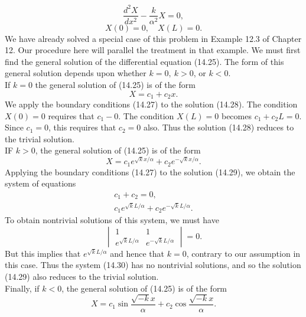 \documentclass[11pt,a4paper, twoside]{report}
\begin{document}
	\begin{equation}\tag{14.25}
		\frac{d^2X}{dx^2} - \frac{k}{\alpha^2}X = 0,
	\end{equation}
	\begin{equation}\tag{14.27}
		X(0) = 0,\quad X(L) = 0.
	\end{equation}
	We have already solved a special case of this problem in Example 12.3 of Chapter 12. Our procedure here will parallel the treatment in that example. We must first find the general solution of the differential equation (14.25). The form of this general solution depends upon whether $k = 0,\ k > 0$, or $k < 0$.\\
	If $k = 0$ the general solution of (14.25) is of the form
	\begin{equation}\tag{14.28}\label{14.28}
		X = c_1 + c_2x.
	\end{equation}
	We apply the boundary conditions (14.27) to the solution (14.28). The condition $X(0) = 0$ requires that $c_1 - 0$. The condition $X(L) = 0$ becomes $c_1 + c_2L = 0$. Since $c_1 = 0$, this requires that $c_2 = 0$ also. Thus the solution (14.28) reduces to the trivial solution.\\
	IF $k>0$, the general solution of (14.25) is of the form
	\begin{equation}\tag{14.29}\label{14.29}
		X = c_1e^{\sqrt{k}x/\alpha} + c_2e^{-\sqrt{k}x/\alpha}.
	\end{equation}
	Applying the boundary conditions (14.27) to the solution (14.29), we obtain the system of equations
	\begin{equation}\tag{14.30}\label{14.30}
		\begin{aligned}
			c_1 + c_2 = 0,\\
			c_1e^{\sqrt{k}L/\alpha} + c_2e^{-\sqrt{k}L/\alpha}.
		\end{aligned}
	\end{equation}
	To obtain nontrivial solutions of this system, we must have
	$$
	\begin{vmatrix}
		1 & 1\\
		e^{\sqrt{k}L/\alpha} & e^{-\sqrt{k}L/\alpha}
	\end{vmatrix} = 0.
	$$
	But this implies that $e^{\sqrt{k}L/\alpha}$ and hence that $k = 0$, contrary to our assumption in this case. Thus the system (14.30) has no nontrivial solutions, and so the solution (14.29) also reduces to the trivial solution.\\
	Finally, if $k<0$, the general solution of (14.25) is of the form
	\begin{equation}\tag{14.31}\label{14.31}
		X = c_1 \sin \frac{\sqrt{-k}x}{\alpha} + c_2 \cos \frac{\sqrt{-k}x}{\alpha}.
	\end{equation}
\end{document}
